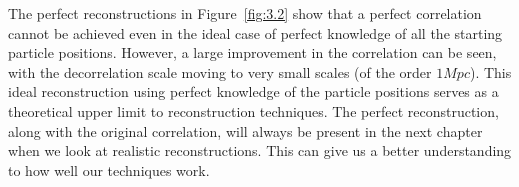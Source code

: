 The perfect reconstructions in Figure~\ref{fig:3.2} show that a perfect correlation cannot be achieved even in the ideal case of perfect knowledge of all the starting particle positions. However, a large improvement in the correlation can be seen, with the decorrelation scale moving to very small scales (of the order $1 Mpc$). This ideal reconstruction using perfect knowledge of the particle positions serves as a theoretical upper limit to reconstruction techniques. The perfect reconstruction, along with the original correlation, will always be present in the next chapter when we look at realistic reconstructions. This can give us a better understanding to how well our techniques work.


    
    
